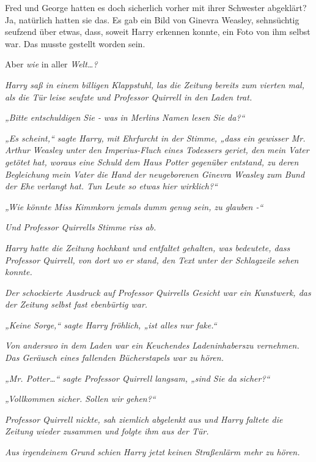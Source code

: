 {Fred und George hatten es doch sicherlich vorher mit ihrer Schwester abgeklärt? Ja, natürlich hatten sie das. Es gab ein Bild von Ginevra Weasley, sehnsüchtig seufzend über etwas, dass, soweit Harry erkennen konnte, ein Foto von ihm selbst war. Das musste gestellt worden sein.

Aber \emph{wie} in aller \emph{Welt…?}

\emph{Harry saß in einem billigen Klappstuhl, las die Zeitung bereits zum vierten mal, als die Tür leise seufzte und Professor Quirrell in den Laden trat.}

\emph{„Bitte entschuldigen Sie -} \emph{\emph{was}} \emph{in Merlins Namen lesen Sie da?“}

\emph{„Es scheint,“ sagte Harry, mit Ehrfurcht in der Stimme, „dass ein gewisser Mr. Arthur Weasley unter den Imperius-Fluch eines Todessers geriet, den} \emph{mein Vater getötet hat, woraus eine Schuld dem Haus Potter gegenüber entstand, zu deren Begleichung mein Vater die Hand der neugeborenen Ginevra Weasley} \emph{zum Bund der Ehe} \emph{verlangt hat. Tun Leute so etwas hier wirklich?“}

\emph{„Wie könnte Miss Kimmkorn} \emph{\emph{jemals}} \emph{dumm genug sein, zu glauben -“}

\emph{Und Professor Quirrells Stimme riss ab.}

\emph{Harry hatte die Zeitung hochkant und} \emph{entfaltet gehalten, was bedeutete, dass Professor Quirrell, von dort wo er stand, den Text unter der Schlagzeile sehen konnte.}

\emph{Der schockierte Ausdruck auf Professor Quirrells Gesicht war ein Kunstwerk, das} \emph{der Zeitung selbst fast ebenbürtig war.}

\emph{„Keine Sorge,“ sagte Harry fröhlich, „ist alles nur fake.“}

\emph{Von anderswo} \emph{in dem Laden war} \emph{ein Keuchendes} \emph{Ladeninhaberszu vernehmen. Das Geräusch eines fallenden Bücherstapels war zu hören.}

\emph{„Mr. Potter…“ sagte Professor Quirrell langsam, „sind Sie da} \emph{\emph{sicher?}“}

\emph{„Vollkommen sicher. Sollen wir gehen?“}

\emph{Professor Quirrell nickte, sah ziemlich abgelenkt aus und Harry faltete die Zeitung wieder zusammen und folgte ihm aus der Tür.}

\emph{Aus irgendeinem Grund schien Harry jetzt keinen Straßenlärm mehr zu hören.}

}
